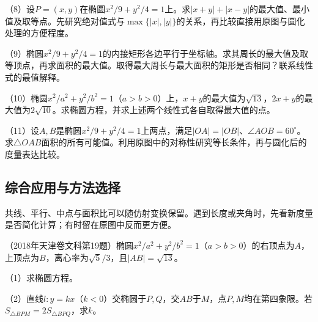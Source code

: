 \begin{exercise}
\begin{samepage}
（8）设\(P=(x,y)\)在椭圆\(x^2/9+y^2/4=1\)上。求\(|x+y|+|x-y|\)的最大值、最小值及取等点。先研究绝对值式与\(\max\{|x|,|y|\}\)的关系，再比较直接用原图与圆化处理的方便程度。
\par
\end{samepage}

\begin{samepage}
（9）椭圆\(x^2/9+y^2/4=1\)的内接矩形各边平行于坐标轴。求其周长的最大值及取等顶点，再求面积的最大值。取得最大周长与最大面积的矩形是否相同？联系线性式的最值解释。
\par
\end{samepage}

\begin{samepage}
（10）椭圆\(x^2/a^2+y^2/b^2=1\)（\(a>b>0\)）上，\(x+y\)的最大值为\(\sqrt{13}\)，\(2x+y\)的最大值为\(2\sqrt{10}\)。求椭圆方程，并求上述两个线性式各自取得最大值的点。
\par
\end{samepage}

\begin{samepage}
（11）设\(A,B\)是椭圆\(x^2/9+y^2/4=1\)上两点，满足\(|OA|=|OB|\)、\(\angle AOB=60^\circ\)。求\(\triangle OAB\)面积的所有可能值。利用原图中的对称性研究等长条件，再与圆化后的度量表达比较。
\par
\end{samepage}
\end{exercise}

\newpage
\subsection{综合应用与方法选择}
\label{subsec:quadratic-affine-problem-solving}

共线、平行、中点与面积比可以随仿射变换保留。遇到长度或夹角时，先看新度量是否简化计算；有时留在原图中反而更方便。

\begin{samepage}
\begin{example}\label{ex:quadratic-affine-method-choice}
（2018年天津卷文科第19题）椭圆\(x^2/a^2+y^2/b^2=1\)（\(a>b>0\)）的右顶点为\(A\)，上顶点为\(B\)，离心率为\(\sqrt5/3\)，且\(|AB|=\sqrt{13}\)。

\begin{samepage}
（1）求椭圆方程。
\par
\end{samepage}

\begin{samepage}
（2）直线\(l:y=kx\)（\(k<0\)）交椭圆于\(P,Q\)，交\(AB\)于\(M\)，点\(P,M\)均在第四象限。若\(S_{\triangle BPM}=2S_{\triangle BPQ}\)，求\(k\)。
\par
\end{samepage}
\end{example}
\end{samepage}

